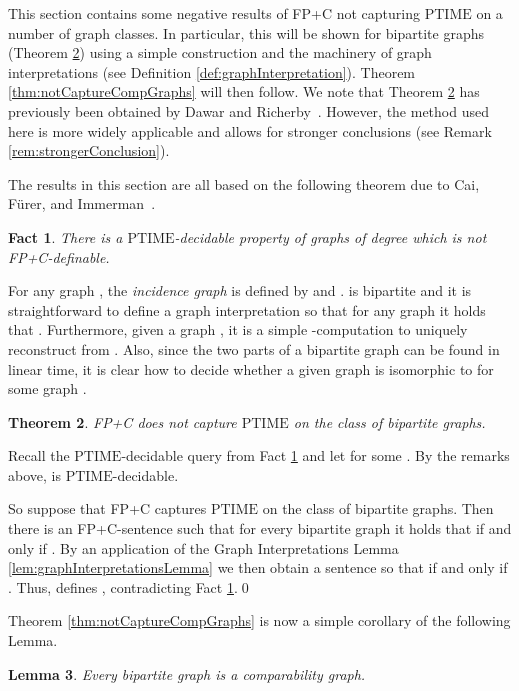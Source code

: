 \documentclass[10pt]{article}
\newtheorem{thm}{Theorem}[section]
\newtheorem{lem}[thm]{Lemma}
\theoremstyle{remark}
\theoremstyle{definition}
\theoremstyle{plain}
\newtheorem{fact}[thm]{Fact}
\newcommand{\logic}[1]{\textsf{\upshape\relsize{-0.5}#1}\xspace}
\newcommand{\FPC}{\logic{FP+C}}
\newcommand{\cclass}[1]{\ensuremath{\mathrm{#1}}\xspace}
\newcommand{\PTIME}{\cclass{PTIME}}
\begin{document}
This section contains some negative results of \FPC not capturing \PTIME on a number of graph classes. In particular, this will be shown for bipartite graphs (Theorem \ref{thm:notCapOnBipGraphs}) using a simple construction and the machinery of graph interpretations (see Definition \ref{def:graphInterpretation}). Theorem \ref{thm:notCaptureCompGraphs} will then follow. We note that Theorem \ref{thm:notCapOnBipGraphs} has previously been obtained by Dawar and Richerby~\cite{dawar07power}. However, the method used here is more widely applicable and allows for stronger conclusions (see Remark \ref{rem:strongerConclusion}).

The results in this section are all based on the following theorem due to Cai, F\"urer, and Immerman~\cite{cai92optimal}.

\begin{fact} \label{fact:CFI}
 There is a \PTIME-decidable property  of graphs of degree  which is not \FPC-definable.
\end{fact}

For any graph , the \emph{incidence graph}  is defined by  and .  is bipartite and it is straightforward to define a graph interpretation  so that for any graph  it holds that . Furthermore, given a graph , it is a simple -computation to uniquely reconstruct  from . Also, since the two parts of a bipartite graph can be found in linear time, it is clear how to decide whether a given graph  is isomorphic to  for some graph .

\begin{thm} \label{thm:notCapOnBipGraphs}
 \FPC does not capture \PTIME on the class of bipartite graphs.
\end{thm}

\proof Recall the \PTIME-decidable query  from Fact \ref{fact:CFI} and let  for some . By the remarks above,  is \PTIME-decidable.

So suppose that \FPC captures \PTIME on the class of bipartite graphs. Then there is an \FPC-sentence  such that for every bipartite graph  it holds that  if and only if . By an application of the Graph Interpretations Lemma \ref{lem:graphInterpretationsLemma} we then obtain a sentence  so that  if and only if . Thus,  defines , contradicting Fact \ref{fact:CFI}.\qed


Theorem \ref{thm:notCaptureCompGraphs} is now a simple corollary of the following Lemma.


\begin{lem}\label{lem:bipGraphIsCompGraph}
Every bipartite graph  is a comparability graph.
\end{lem}
\end{document}
